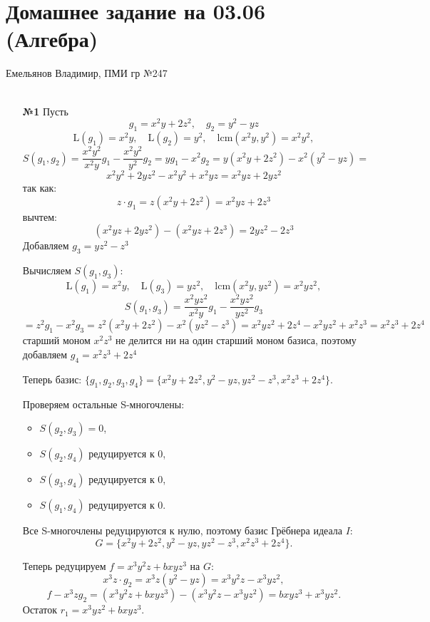 \documentclass[a4paper]{article}
\begin{document}
\section*{Домашнее задание на 03.06 (Алгебра)}
 {\large Емельянов Владимир, ПМИ гр №247}\\\\
\begin{enumerate}
  \item[\textbf{№1}]Пусть
  \[ g_1 = x^2 y + 2z^2, \quad g_2 = y^2 - yz \]
  \[ \text{L}(g_1) = x^2 y, \quad \text{L}(g_2) = y^2, \quad
    \text{lcm}(x^2 y, y^2) = x^2 y^2, \]
  \[ S(g_1, g_2) = \frac{x^2 y^2}{x^2 y} g_1 - \frac{x^2 y^2}{y^2} g_2 =
    y g_1 - x^2 g_2 = y(x^2 y + 2z^2) - x^2(y^2 - yz) =\]
  \[ x^2 y^2 + 2y z^2 - x^2 y^2 +
    x^2 y z = x^2 y z + 2y z^2 \]
  так как:
  \[ z \cdot g_1 = z(x^2 y + 2z^2) = x^2 y z + 2z^3 \]
  вычтем:
  \[ (x^2 y z + 2y z^2) - (x^2 y z + 2z^3) = 2y z^2 - 2z^3 \]
  Добавляем \( g_3 = y z^2 - z^3 \)

  Вычисляем \( S(g_1, g_3) \):
  \[ \text{L}(g_1) = x^2 y, \quad \text{L}(g_3) =
    y z^2, \quad \text{lcm}(x^2 y, y z^2) = x^2 y z^2, \]
  \[ S(g_1, g_3) = \frac{x^2 y z^2}{x^2 y} g_1 - \frac{x^2 y z^2}{y z^2} g_3 \]
  \[= z^2 g_1 - x^2 g_3 = z^2(x^2 y + 2z^2) - x^2(y z^2 - z^3) =
    x^2 y z^2 + 2z^4 - x^2 y z^2 + x^2 z^3 = x^2 z^3 + 2z^4 \]
  старший моном \( x^2 z^3 \) не делится ни на один старший моном базиса, поэтому добавляем \( g_4 = x^2 z^3 + 2z^4 \)

  Теперь базис: \( \{g_1, g_2, g_3, g_4\} = \{x^2 y + 2z^2, y^2 - yz, y z^2 - z^3, x^2 z^3 + 2z^4\} \).

  Проверяем остальные S-многочлены:
  \begin{itemize}
    \item\( S(g_2, g_3) = 0 \),
    \item\( S(g_2, g_4) \) редуцируется к 0,
    \item\( S(g_3, g_4) \) редуцируется к 0,
    \item\( S(g_1, g_4) \) редуцируется к 0.
  \end{itemize}
  Все S-многочлены редуцируются к нулю, поэтому базис 
  Грёбнера идеала \( I \):
  \[ G = \{x^2 y + 2z^2, y^2 - yz, y z^2 - z^3, x^2 z^3 + 2z^4\}. \]

  Теперь редуцируем \( f = x^3 y^2 z + b x y z^3 \) на \( G \):  
  \[ x^3 z \cdot g_2 = x^3 z (y^2 - yz) = x^3 y^2 z - x^3 y z^2, \]  
  \[ f - x^3 z g_2 = (x^3 y^2 z + b x y z^3) - (x^3 y^2 z - x^3 y z^2) = b x y z^3 + x^3 y z^2. \]  
  Остаток \( r_1 = x^3 y z^2 + b x y z^3 \).  


\end{enumerate}
\end{document}
